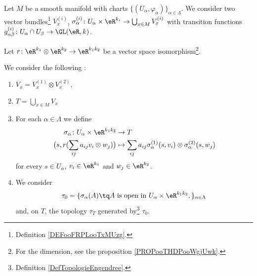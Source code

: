 \begin{propositionDef}		\label{DEFooCSDZooJuzGuE}
	Let \( M \) be a smooth manifold with charts \( \{ (U_{\alpha},\varphi_{\alpha}) \}_{\alpha\in\Lambda}\). We consider two vector bundles\footnote{Definition \ref{DEFooFRPLooTxMUzg}.} \( V_x^{(i)}\), \( \sigma_{\alpha}^{(i)}  \colon U_{\alpha}\times \eR^{k_i}\to \bigcup_{x\in M}V_x^{(i)} \) with transition functions \(g_{\alpha\beta}^{(i)} \colon U_{\alpha}\cap U_{\beta}\to \GL(\eR,k)  \).

	Let \(r \colon \eR^{k_1}\otimes \eR^{k_2}\to \eR^{k_1k_2}  \) be a vector space isomorphism\footnote{For the dimension, see the proposition \ref{PROPooTHDPooWgjUwk}.}.

	We consider the following :
	\begin{enumerate}
		\item
		      \( V_x=V_x^{(1)}\otimes V_x^{(2)}\),
		\item
		      \( T=\bigcup_{x\in M}V_x\)
		\item For each \( \alpha\in \Lambda\) we define
		      \begin{equation}		\label{EQooXHURooBpOMlU}
			      \begin{aligned}
				      \sigma_{\alpha}\colon U_{\alpha}\times \eR^{k_1k_2} & \to T                                                                                   \\
				      \big( s, r(\sum_{ij}a_{ij} v_i\otimes w_j) \big)    & \mapsto \sum_{ij}a_{ij}\sigma_{\alpha}^{(1)}(s,v_i)\otimes \sigma_{\alpha}^{(2)}(s,w_j)
			      \end{aligned}
		      \end{equation}
		      for every \( s\in U_{\alpha}\), \( v_i\in \eR^{k_1}\) and \( w_j\in \eR^{k_2}\).
		\item
		      We consider
		      \begin{equation}
			      \tau_0=\{ \sigma_{\alpha}(A)\tq  \text{\( A\) is open in \( U_{\alpha}\times \eR^{k_1k_2}\)},
			      \}_{\alpha\in\Lambda}
		      \end{equation}
		      and, on \( T\), the topology \( \tau_T\) generated by\footnote{Definition \ref{DefTopologieEngendree}.} \( \tau_0\).
	\end{enumerate}


\end{propositionDef}
